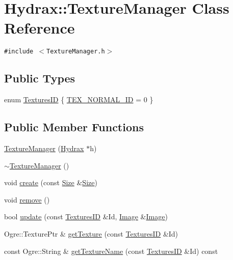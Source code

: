 \hypertarget{class_hydrax_1_1_texture_manager}{
\section{Hydrax::TextureManager Class Reference}
\label{class_hydrax_1_1_texture_manager}
}
{\tt \#include $<$TextureManager.h$>$}

\subsection*{Public Types}
\begin{CompactItemize}
\item 
enum \hyperlink{class_hydrax_1_1_texture_manager_9af2a9718c00e64eb188c3dd9cd0fd04}{TexturesID} \{ \hyperlink{class_hydrax_1_1_texture_manager_9af2a9718c00e64eb188c3dd9cd0fd04f04e9f7557359214c8000825a6b75922}{TEX\_\-NORMAL\_\-ID} =  0
 \}
\subsection*{Public Member Functions}
\begin{CompactItemize}
\item 
\hyperlink{class_hydrax_1_1_texture_manager_bad81d53663c93a5d2d9bd49eff0ef90}{TextureManager} (\hyperlink{class_hydrax_1_1_hydrax}{Hydrax} $\ast$h)
\item 
\hyperlink{class_hydrax_1_1_texture_manager_d7e356de2834c2f1668826f21c1dbf1d}{$\sim$TextureManager} ()
\item 
void \hyperlink{class_hydrax_1_1_texture_manager_30bfb59332540e897c43193474b4aa19}{create} (const \hyperlink{struct_hydrax_1_1_size}{Size} \&\hyperlink{struct_hydrax_1_1_size}{Size})
\item 
void \hyperlink{class_hydrax_1_1_texture_manager_d6164d9f44096b59b15c92223be0752a}{remove} ()
\item 
bool \hyperlink{class_hydrax_1_1_texture_manager_eec28019cfbb7d4ec705b07d5519f98a}{update} (const \hyperlink{class_hydrax_1_1_texture_manager_9af2a9718c00e64eb188c3dd9cd0fd04}{TexturesID} \&Id, \hyperlink{class_hydrax_1_1_image}{Image} \&\hyperlink{class_hydrax_1_1_image}{Image})
\item 
Ogre::TexturePtr \& \hyperlink{class_hydrax_1_1_texture_manager_7f15f24a8ff1372f6a1840c27aec655f}{getTexture} (const \hyperlink{class_hydrax_1_1_texture_manager_9af2a9718c00e64eb188c3dd9cd0fd04}{TexturesID} \&Id)
\item 
const Ogre::String \& \hyperlink{class_hydrax_1_1_texture_manager_ba3bf13c7d3971c9cbf2b32c650d906e}{getTextureName} (const \hyperlink{class_hydrax_1_1_texture_manager_9af2a9718c00e64eb188c3dd9cd0fd04}{TexturesID} \&Id) const 
\end{CompactItemize}



\end{CompactItemize}
